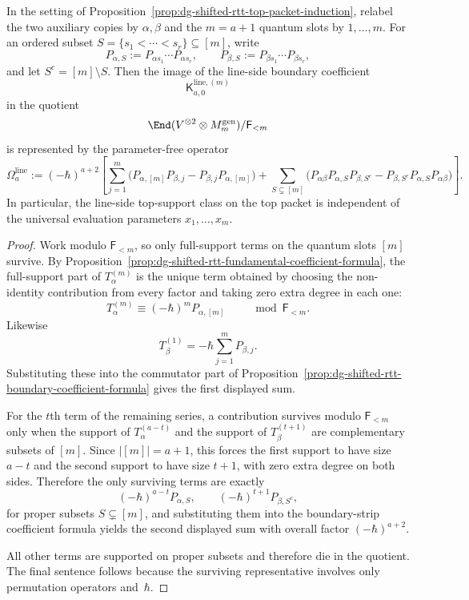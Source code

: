 \begin{proposition}
\label{prop:dg-shifted-rtt-top-packet-line-formula}
In the setting of
Proposition~\ref{prop:dg-shifted-rtt-top-packet-induction}, relabel the
two auxiliary copies by $\alpha,\beta$ and the $m=a+1$ quantum slots by
$1,\dots,m$.  For an ordered subset
$S=\{s_1<\cdots<s_r\}\subseteq [m]$, write
\[
P_{\alpha,S}:=P_{\alpha s_1}\cdots P_{\alpha s_r},
\qquad
P_{\beta,S}:=P_{\beta s_1}\cdots P_{\beta s_r},
\]
and let $S^c=[m]\setminus S$.  Then the image of the line-side boundary
coefficient
\[
\mathsf{K}^{\mathrm{line},(m)}_{a,0}
\]
in the quotient
\[
\End(V^{\otimes 2}\otimes M_m^{\mathrm{gen}})/\mathsf{F}_{<m}
\]
is represented by the parameter-free operator
\[
\Omega_a^{\mathrm{line}}
:=
(-\hbar)^{a+2}
\left[
\sum_{j=1}^{m}
\bigl(
P_{\alpha,[m]}P_{\beta,j}-P_{\beta,j}P_{\alpha,[m]}
\bigr)
+\sum_{S\subsetneq [m]}
\bigl(
P_{\alpha\beta}P_{\alpha,S}P_{\beta,S^c}
-P_{\beta,S^c}P_{\alpha,S}P_{\alpha\beta}
\bigr)
\right].
\]
In particular, the line-side top-support class on the top packet is
independent of the universal evaluation parameters $x_1,\dots,x_m$.
\end{proposition}

\begin{proof}
Work modulo $\mathsf{F}_{<m}$, so only full-support terms on the
quantum slots $[m]$ survive.  By
Proposition~\ref{prop:dg-shifted-rtt-fundamental-coefficient-formula},
the full-support part of $T_\alpha^{(m)}$ is the unique term obtained
by choosing the non-identity contribution from every factor and taking
zero extra degree in each one:
\[
T_\alpha^{(m)}\equiv (-\hbar)^m P_{\alpha,[m]}
\qquad \mod \mathsf{F}_{<m}.
\]
Likewise
\[
T_\beta^{(1)}=-\hbar\sum_{j=1}^{m}P_{\beta,j}.
\]
Substituting these into the commutator part of
Proposition~\ref{prop:dg-shifted-rtt-boundary-coefficient-formula}
gives the first displayed sum.

For the $t$th term of the remaining series, a contribution survives
modulo $\mathsf{F}_{<m}$ only when the support of $T_\alpha^{(a-t)}$
and the support of $T_\beta^{(t+1)}$ are complementary subsets of
$[m]$.  Since $|[m]|=a+1$, this forces the first support to have size
$a-t$ and the second support to have size $t+1$, with zero extra
degree on both sides.  Therefore the only surviving terms are exactly
\[
(-\hbar)^{a-t}P_{\alpha,S},
\qquad
(-\hbar)^{t+1}P_{\beta,S^c},
\]
for proper subsets $S\subsetneq [m]$, and substituting them into the
boundary-strip coefficient formula yields the second displayed sum with
overall factor $(-\hbar)^{a+2}$.

All other terms are supported on proper subsets and therefore die in
the quotient.  The final sentence follows because the surviving
representative involves only permutation operators and~$\hbar$.
\end{proof}

